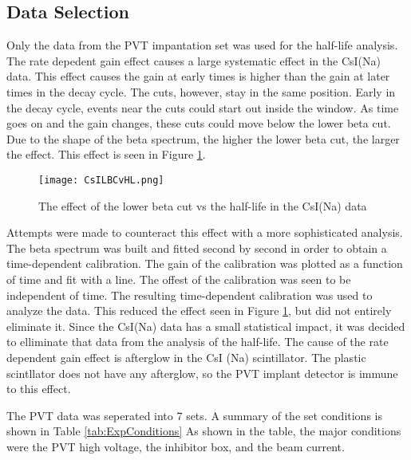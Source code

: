 \subsection{Data Selection}
Only the data from the PVT impantation set was used for the half-life analysis.
The rate depedent gain effect causes a large systematic effect in the CsI(Na) data.
This effect causes the gain at early times is higher than the gain at later times in the decay cycle.
The cuts, however, stay in the same position.
Early in the decay cycle, events near the cuts could start out inside the window.
As time goes on and the gain changes, these cuts could move below the lower beta cut. 
Due to the shape of the beta spectrum, the higher the lower beta cut, the larger the effect.
This effect is seen in Figure \ref{fig:LBCvHL}.

\begin{figure}[!htb]
	\centerline{\texttt{[image: CsILBCvHL.png]}}
	\caption{The effect of the lower beta cut vs the half-life in the CsI(Na) data}
	\label{fig:LBCvHL}
\end{figure}

Attempts were made to counteract this effect with a more sophisticated analysis.
The beta spectrum was built and fitted second by second in order to obtain a time-dependent calibration.
The gain of the calibration was plotted as a function of time and fit with a line.
The offest of the calibration was seen to be independent of time.
The resulting time-dependent calibration was used to analyze the data.
This reduced the effect seen in Figure \ref{fig:LBCvHL}, but did not entirely eliminate it.
Since the CsI(Na) data has a small statistical impact, it was decided to elliminate that data from the analysis of the half-life.
The cause of the rate dependent gain effect is afterglow in the CsI (Na) scintillator.
The plastic scintllator does not have any afterglow, so the PVT implant detector is immune to this effect. 

The PVT data was seperated into 7 sets.
A summary of the set conditions is shown in Table \ref{tab:ExpConditions}
As shown in the table, the major conditions were the PVT high voltage, the inhibitor box, and the beam current. 

